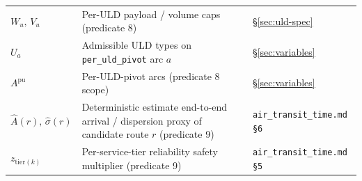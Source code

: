 \documentclass[11pt,a4paper]{article}
\theoremstyle{definition}
\begin{document}
\begin{table}[H]
\begin{tabular}{lp{9cm}p{3.5cm}}
$W_u,\, V_u$ & Per-ULD payload / volume caps (predicate 8) & \S\ref{sec:uld-spec} \\
$U_a$ & Admissible ULD types on \texttt{per\_uld\_pivot} arc $a$ & \S\ref{sec:variables} \\
$A^{\text{pu}}$ & Per-ULD-pivot arcs (predicate 8 scope) & \S\ref{sec:variables} \\
$\hat{A}(r),\, \hat{\sigma}(r)$ & Deterministic estimate end-to-end arrival / dispersion proxy of candidate route $r$ (predicate 9) & \texttt{air\_transit\_time.md \S6} \\
$z_{\text{tier}(k)}$ & Per-service-tier reliability safety multiplier (predicate 9) & \texttt{air\_transit\_time.md \S5} \\
\bottomrule
\end{tabular}
\end{table}
\end{document}

